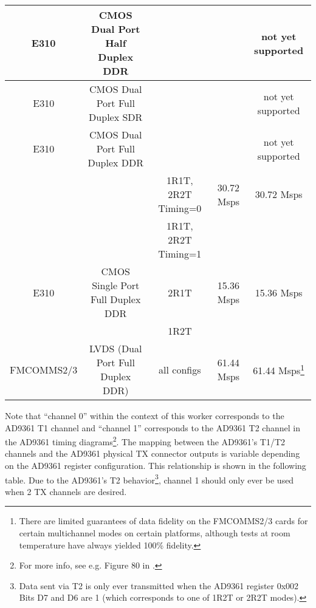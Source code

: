 \documentclass{article}
\begin{document}
\begin{sloppypar}
\begin{scriptsize}
\begin{longtable}{|c|c|c|c|c|}
    \hline
    E310 & CMOS Dual   Port Half Duplex DDR &                   & & not yet supported \\
    \hline
    E310 & CMOS Dual   Port Full Duplex SDR &                   & & not yet supported  \\
    \hline
    E310 & CMOS Dual   Port Full Duplex DDR &                   & & not yet supported  \\
    \hline
         &                           & 1R1T, 2R2T Timing=0 & 30.72 Msps & 30.72 Msps \\
    \cline{2-5}
         &                           & 1R1T, 2R2T Timing=1 &            &            \\
    E310 & CMOS Single Port Full Duplex DDR & 2R1T                & 15.36 Msps & 15.36 Msps \\
         &                           & 1R2T                &            &            \\
    \hline
    FMCOMMS2/3 & LVDS (Dual Port Full Duplex DDR) & all configs         & 61.44 Msps & 61.44 Msps\footnote{There are limited guarantees of data fidelity on the FMCOMMS2/3 cards for certain multichannel modes on certain platforms, although tests at room temperature have always yielded 100\% fidelity.} \\
    \hline
	\end{longtable}
\end{scriptsize}
\pagebreak
Note that ``channel 0'' within the context of this worker corresponds to the AD9361 T1 channel and ``channel 1'' corresponds to the AD9361 T2 channel in the AD9361 timing diagrams\footnote{For more info, see e.g. Figure 80 in \cite{adi_ug570}.}. The mapping between the AD9361's T1/T2 channels and the AD9361 physical TX connector outputs is variable depending on the AD9361 register configuration. This relationship is shown in the following table.  Due to the AD9361's T2 behavior\footnote{\label{t2}Data sent via T2 is only ever transmitted when the AD9361 register 0x002 Bits D7 and D6 are 1 (which corresponds to one of 1R2T or 2R2T modes).}, channel 1 should only ever be used when 2 TX channels are desired.
\end{sloppypar}
\end{document}
